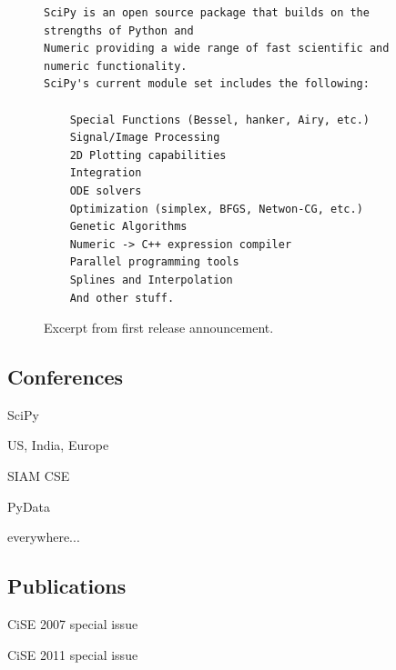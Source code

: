 \documentclass[fleqn,10pt]{wlscirep}
\begin{document}

\begin{figure}
\begin{verbatim}
SciPy is an open source package that builds on the strengths of Python and
Numeric providing a wide range of fast scientific and numeric functionality.
SciPy's current module set includes the following:

    Special Functions (Bessel, hanker, Airy, etc.)
    Signal/Image Processing
    2D Plotting capabilities
    Integration
    ODE solvers
    Optimization (simplex, BFGS, Netwon-CG, etc.)
    Genetic Algorithms
    Numeric -> C++ expression compiler
    Parallel programming tools
    Splines and Interpolation
    And other stuff.
\end{verbatim}
\caption{Excerpt from first release announcement.}\label{fig:announce-0.1}
\end{figure}


\subsection*{Conferences}


SciPy

US, India, Europe

SIAM CSE

PyData

everywhere...

\cite{siamcse09}




\subsection*{Publications}
CiSE 2007 special issue

CiSE 2011 special issue


\cite{dubois2007guest}
\cite{oliphant2007python}
\cite{perez2007ipython}
\cite{hunter2007matplotlib}
\cite{vanderwalt2008scipy}
\cite{peterson2009f2py}
\cite{millman2011python}
\cite{perez2011python}
\cite{vanderwalt2011numpy}
\cite{behnel2011cython}
\cite{pedregosa2011scikit}
\cite{vanderwalt2014scikit}
\cite{millman2014developing}
\cite{meurer2017sympy}
\end{document}
